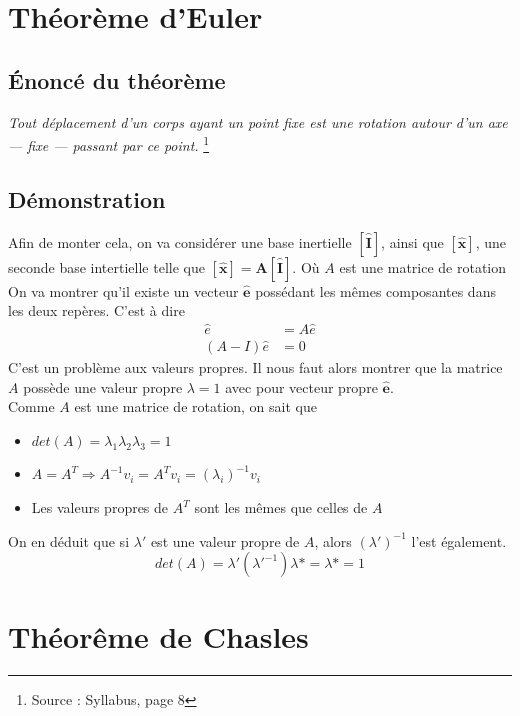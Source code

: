 \section{Théorème d'Euler}
\subsection{Énoncé du théorème}
\textit{Tout déplacement d’un corps ayant un point fixe est une rotation autour d’un
axe — fixe — passant par ce point.} 
\footnote{Source : Syllabus, page 8}\\

\subsection{Démonstration}

Afin de monter cela, on va considérer une base inertielle $\left[ \hat{\textbf{I}}\right]$, ainsi que $\left[ \hat{\textbf{x}}\right]$, une seconde base intertielle telle que $\left[ \hat{\textbf{x}}\right] = \textbf{A} \left[ \hat{\textbf{I}}\right] $. Où $A$ est une matrice de rotation\\
On va montrer qu'il existe un vecteur $\hat{\textbf{e}}$ possédant les mêmes composantes dans les deux repères. C'est à dire 
\begin{align*}
    \hat{e} &= A\hat{e}\\
    \left( A - I\right) \hat{e} &= 0
\end{align*}
C'est un problème aux valeurs propres. Il nous faut alors montrer que la matrice $A$ possède une valeur propre $\lambda = 1$ avec pour vecteur propre $\hat{\textbf{e}}$.\\

Comme $A$ est une matrice de rotation, on sait que 
\begin{itemize}
    \item $det(A) = \lambda_1 \lambda_2 \lambda_3 = 1$
    \item $A = A^T \Rightarrow A^{-1}v_i = A^T v_i =(\lambda_i)^{-1} v_i$
    \item Les valeurs propres de $A^T$ sont les mêmes que celles de $A$
\end{itemize}
On en déduit que si $\lambda'$ est une valeur propre de $A$, alors $(\lambda')^{-1}$ l'est également.
\begin{equation*}
    det(A) = \lambda' (\lambda'^{-1}) \lambda* = \boxed{\lambda* = 1}
\end{equation*}
\section{Théorême de Chasles}
